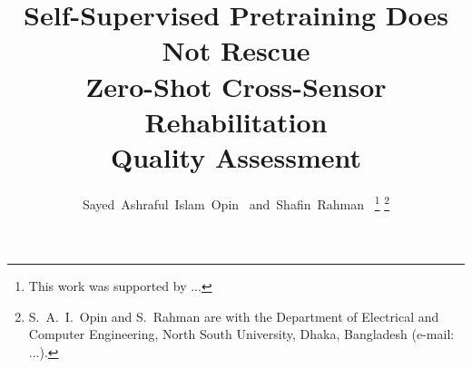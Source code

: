 \documentclass[10pt,journal]{IEEEtran}
\begin{document}
\title{Self-Supervised Pretraining Does Not Rescue\\%
Zero-Shot Cross-Sensor Rehabilitation\\%
Quality Assessment}

\author{Sayed~Ashraful~Islam~Opin~
        and~Shafin~Rahman~%
\thanks{This work was supported by ...}
\thanks{S.~A.~I.~Opin and S.~Rahman are with the Department of Electrical and Computer Engineering, North South University, Dhaka, Bangladesh (e-mail: ...).}}

\maketitle

\end{document}
